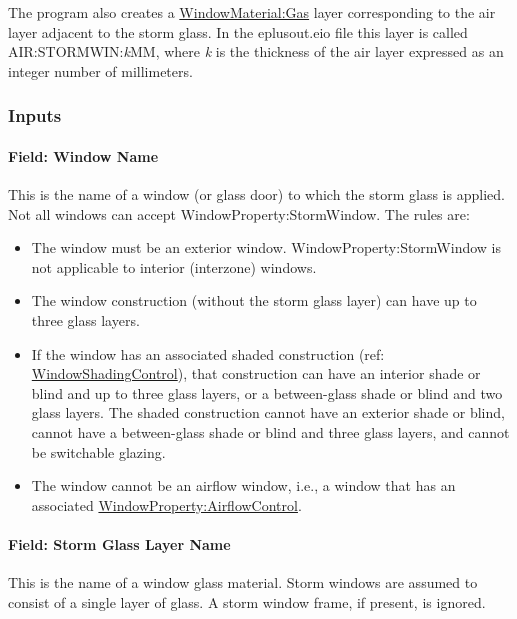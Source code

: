 The program also creates a \hyperref[windowmaterialgas]{WindowMaterial:Gas} layer corresponding to the air layer adjacent to the storm glass. In the eplusout.eio file this layer is called AIR:STORMWIN:\emph{k}MM, where \emph{k} is the thickness of the air layer expressed as an integer number of millimeters.

\subsubsection{Inputs}\label{inputs-35-001}

\paragraph{Field: Window Name}\label{field-window-name-000}

This is the name of a window (or glass door) to which the storm glass is applied. Not all windows can accept WindowProperty:StormWindow. The rules are:

\begin{itemize}
\item
  The window must be an exterior window. WindowProperty:StormWindow is not applicable to interior (interzone) windows.
\item
  The window construction (without the storm glass layer) can have up to three glass layers.
\item
  If the window has an associated shaded construction (ref: \hyperref[windowpropertyshadingcontrol]{WindowShadingControl}), that construction can have an interior shade or blind and up to three glass layers, or a between-glass shade or blind and two glass layers. The shaded construction cannot have an exterior shade or blind, cannot have a between-glass shade or blind and three glass layers, and cannot be switchable glazing.
\item
  The window cannot be an airflow window, i.e., a window that has an associated \hyperref[windowpropertyairflowcontrol]{WindowProperty:AirflowControl}.
\end{itemize}

\paragraph{Field: Storm Glass Layer Name}\label{field-storm-glass-layer-name}

This is the name of a window glass material. Storm windows are assumed to consist of a single layer of glass. A storm window frame, if present, is ignored.

